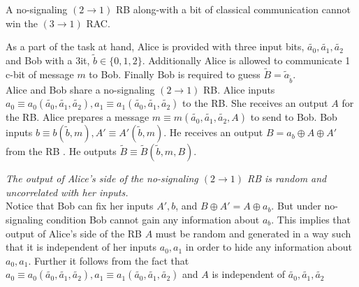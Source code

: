 \begin{mydef2} \label{lem:2to13-1}
A no-signaling $(2\rightarrow 1)$ RB along-with a bit of classical communication cannot win the $(3\rightarrow 1)$ RAC.
\end{mydef2} 
As a part of the task at hand, Alice is provided with three input bits, $\tilde{a_0},\tilde{a_1},\tilde{a_2}$ and Bob with a $3$it, $\tilde{b}\in \{0,1,2\}$. Additionally Alice is allowed to communicate 1 c-bit of message $m$ to Bob. Finally Bob is required to guess $\tilde{B}=\tilde{a}_{\tilde{b}}$.\\
Alice and Bob share a no-signaling $(2\rightarrow 1)$  RB.  Alice inputs $a_0\equiv a_0(\tilde{a_0},\tilde{a_1},\tilde{a_2}),a_1\equiv a_1(\tilde{a_0},\tilde{a_1},\tilde{a_2})$ to the RB. She receives an output $A$ for the RB. Alice prepares a message $m\equiv m(\tilde{a_0},\tilde{a_1},\tilde{a_2},A)$ to send to Bob. Bob inputs $b\equiv b(\tilde{b},m), A' \equiv A'(\tilde{b},m)$. He receives an output $B=a_b\oplus A \oplus A'$ from the RB . He outputs $\tilde{B}\equiv \tilde{B}(\tilde{b},m,B)$. \\
\begin{mydef4} \label{obs:1} \textit{The output of Alice's side of the no-signaling $(2\rightarrow 1)$ RB is random and uncorrelated with her inputs.} \\
Notice that Bob can fix her inputs $A',b$, and $B\oplus A'=A\oplus a_b$. But under no-signaling condition Bob cannot gain any information about $a_b$. This implies that output of Alice's side of the RB $A$ must be random and generated in a way such that it is independent of her inputs $a_0,a_1$ in order to hide any information about $a_0,a_1$.
Further it follows from the fact that $a_0\equiv a_0(\tilde{a_0},\tilde{a_1},\tilde{a_2}),a_1\equiv a_1(\tilde{a_0},\tilde{a_1},\tilde{a_2})$ and $A$ is independent of $\tilde{a_0},\tilde{a_1},\tilde{a_2}$\\
\end{mydef4} 


